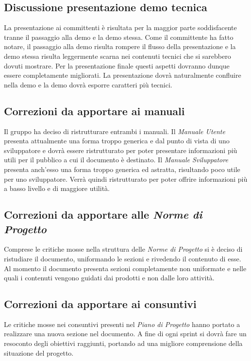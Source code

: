 \subsection{Discussione presentazione demo tecnica}
La presentazione ai committenti è risultata per la maggior parte soddisfacente tranne il passaggio alla demo e la demo stessa. Come il committente ha fatto notare, il passaggio alla demo risulta rompere il flusso della presentazione e la demo stessa risulta leggermente scarna nei contenuti tecnici che si sarebbero dovuti mostrare. \newline{} Per la presentazione finale questi aspetti dovranno dunque essere completamente migliorati. La presentazione dovrà naturalmente confluire nella demo e la demo dovrà esporre caratteri più tecnici.

\subsection{Correzioni da apportare ai manuali}
Il gruppo ha deciso di ristrutturare entrambi i manuali. Il \textit{Manuale Utente} presenta attualmente una forma troppo generica e dal punto di vista di uno sviluppatore e dovrà essere ristrutturato per poter presentare informazioni più utili per il pubblico a cui il documento è destinato. \newline{}
Il \textit{Manuale Sviluppatore} presenta anch'esso una forma troppo generica ed astratta, risultando poco utile per uno sviluppatore. Verrà quindi ristrutturato per poter offrire informazioni più a basso livello e di maggiore utilità.

\subsection{Correzioni da apportare alle \textit{Norme di Progetto}}
Comprese le critiche mosse nella struttura delle \textit{Norme di Progetto} si è deciso di ristudiare il documento, uniformando le sezioni e rivedendo il contenuto di esse. Al momento il documento presenta sezioni completamente non uniformate e nelle quali i contenuti vengono guidati dai prodotti e non dalle loro attività.

\subsection{Correzioni da apportare ai consuntivi}
Le critiche mosse nei consuntivi presenti nel \textit{Piano di Progetto} hanno portato a realizzare una nuova sezione nel documento. A fine di ogni sprint si dovrà fare un resoconto degli obiettivi raggiunti, portando ad una migliore comprensione della situazione del progetto.



